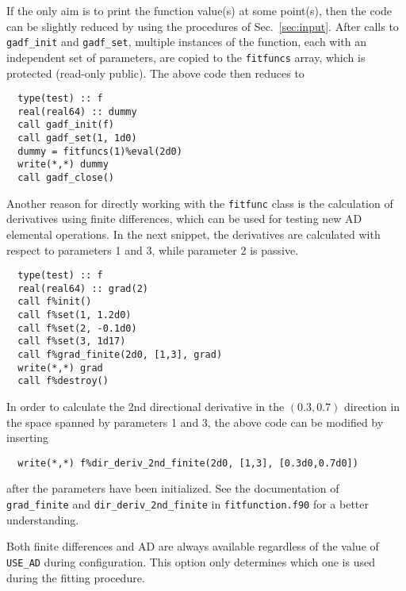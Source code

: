 \documentclass{article}
\begin{document}
If the only aim is to print the function value(s) at some point(s),
then the code can be slightly reduced by using the procedures of
Sec.~\ref{sec:input}. After calls to \verb+gadf_init+ and
\verb+gadf_set+, multiple instances of the function, each with an
independent set of parameters, are copied to the \verb+fitfuncs+
array, which is protected (read-only public). The above code then
reduces to
\begin{verbatim}
  type(test) :: f
  real(real64) :: dummy
  call gadf_init(f)
  call gadf_set(1, 1d0)
  dummy = fitfuncs(1)%eval(2d0)
  write(*,*) dummy
  call gadf_close()
\end{verbatim}
Another reason for directly working with the \verb+fitfunc+ class is
the calculation of derivatives using finite differences, which can be
used for testing new AD elemental operations. In the next snippet, the
derivatives are calculated with respect to parameters 1 and 3, while
parameter 2 is passive.
\begin{verbatim}
  type(test) :: f
  real(real64) :: grad(2)
  call f%init()
  call f%set(1, 1.2d0)         
  call f%set(2, -0.1d0)
  call f%set(3, 1d17)
  call f%grad_finite(2d0, [1,3], grad)
  write(*,*) grad
  call f%destroy()
\end{verbatim}
In order to calculate the 2nd directional derivative in the
$(0.3,0.7)$ direction in the space spanned by parameters 1 and 3, the
above code can be modified by inserting
\begin{verbatim}
  write(*,*) f%dir_deriv_2nd_finite(2d0, [1,3], [0.3d0,0.7d0])
\end{verbatim}
after the parameters have been initialized. See the documentation of
\\\verb+grad_finite+ and \verb+dir_deriv_2nd_finite+ in
\verb+fitfunction.f90+ for a better understanding.

Both finite differences and AD are always available regardless of the
value of \verb+USE_AD+ during configuration. This option only
determines which one is used during the fitting procedure.
\end{document}
